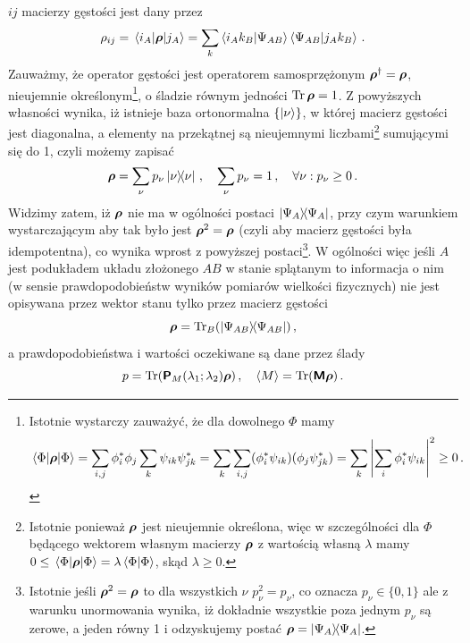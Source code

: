 \documentclass{myclass}
\begin{document}
\(ij\) macierzy gęstości jest dany przez
\begin{equation*}
    \rho_{ij} = \mel{i_A}{\boldsymbol{\mathsf{\rho}}}{j_A} = \sum_k \braket{i_Ak_B}{\Psi_{AB}}\braket{\Psi_{AB}}{j_Ak_B}\,.
\end{equation*}
Zauważmy, że operator gęstości jest operatorem samosprzężonym \(\boldsymbol{\mathsf{\rho}}^\dagger = \boldsymbol{\mathsf{\rho}}\),
nieujemnie określonym\footnote{Istotnie wystarczy zauważyć, że dla dowolnego \(\Phi\) mamy 
\begin{equation*}
    \mel{\Phi}{\boldsymbol{\mathsf{\rho}}}{\Phi} = \sum_{i,j}\phi_i^*\phi_j\sum_k \psi_{ik}\psi_{jk}^* = \sum_k \sum_{i,j}(\phi_i^*\psi_{ik})(\phi_j\psi_{jk}^*) = \sum_k \left|\sum_{i}\phi_i^*\psi_{ik}\right|^2 \geq 0\,.
\end{equation*}
}, o śladzie równym jedności \(\Trace\oper{\rho} = 1\). Z powyższych własności wynika, iż istnieje
baza ortonormalna \(\{\ket{\nu}\}\), w której macierz gęstości jest diagonalna, a elementy na
przekątnej są nieujemnymi liczbami\footnote{Istotnie ponieważ \(\boldsymbol{\mathsf{\rho}}\) jest nieujemnie
określona, więc w szczególności dla \(\Phi\) będącego wektorem własnym macierzy \(\boldsymbol{\mathsf{\rho}}\) z
wartością własną \(\lambda\) mamy \(0 \leq \mel{\Phi}{\boldsymbol{\mathsf{\rho}}}{\Phi} = \lambda \braket{\Phi}\),
skąd \(\lambda \geq 0\).} sumującymi się do 1, czyli możemy zapisać
\begin{equation*}
    \oper{\rho} = \sum_\nu p_\nu \dyad{\nu}\,,\quad \sum_\nu p_\nu = 1\,,\quad \forall\nu:p_\nu \geq 0\,.
\end{equation*}
Widzimy zatem, iż \(\boldsymbol{\mathsf{\rho}}\) nie ma w ogólności postaci \(\dyad{\Psi_A}\), przy czym warunkiem
wystarczającym aby tak było jest \(\boldsymbol{\mathsf{\rho}}^2 = \boldsymbol{\mathsf{\rho}}\) (czyli aby macierz gęstości była
idempotentna), co wynika wprost z powyższej postaci\footnote{Istotnie jeśli \(\boldsymbol{\mathsf{\rho}}^2 =
\boldsymbol{\mathsf{\rho}}\) to dla wszystkich \(\nu\) \(p_\nu ^2 = p_\nu\), co oznacza \(p_\nu \in \{0,1\}\) ale z
warunku unormowania wynika, iż dokładnie wszystkie poza jednym \(p_\nu\) są zerowe, a jeden równy 1
i odzyskujemy postać \(\oper{\rho} = \dyad{\Psi_A}\).}. W ogólności więc jeśli \(A\) jest podukładem
układu złożonego \(AB\) w stanie splątanym to informacja o nim (w sensie prawdopodobieństw wyników
pomiarów wielkości fizycznych) nie jest opisywana przez wektor stanu tylko przez macierz gęstości 
\begin{equation*}
    \oper{\rho} = \Trace_B(\dyad{\Psi_{AB}})\,,
\end{equation*}
a prawdopodobieństwa i wartości oczekiwane są dane przez ślady
\begin{equation*}
    p = \Trace(\oper{P}_M(\lambda_1;\lambda_2)\oper{\rho})\,,\quad \expval{M} = \Trace(\oper{M}\oper{\rho})\,.
\end{equation*}
\end{document}
